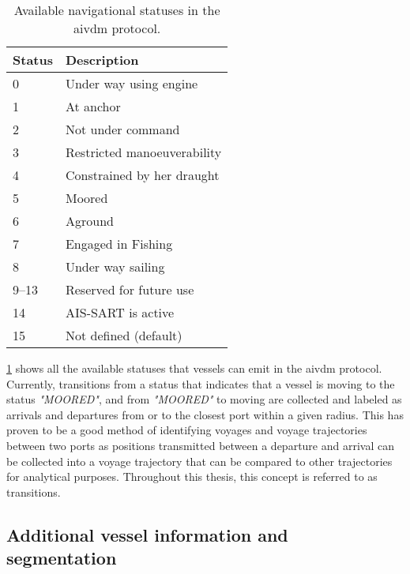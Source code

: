 \begin{table}
    \centering
    \small{\begin{tabular}{l l}
    \toprule
        \textbf{Status} & \textbf{Description} \\ \midrule
        0 & Under way using engine \\ \midrule
        1 & At anchor \\ \midrule
        2 & Not under command \\ \midrule
        3 & Restricted manoeuverability \\ \midrule
        4 & Constrained by her draught \\ \midrule
        5 & Moored \\ \midrule
        6 & Aground \\ \midrule
        7 & Engaged in Fishing \\ \midrule
        8 & Under way sailing \\ \midrule
        9--13 & Reserved for future use \\ \midrule
        14 & AIS-SART is active \\ \midrule
        15 & Not defined (default) \\ \bottomrule
    \end{tabular}}
    \caption{Available navigational statuses in the \gls{aivdm} protocol.}\label{tab:nav_stats}
\end{table}

\cref{tab:nav_stats} shows all the available statuses that vessels can emit in the \gls{aivdm} protocol. Currently, transitions from a status that indicates that a vessel is moving to the status \textit{"MOORED"}, and from \textit{"MOORED"} to moving are collected and labeled as arrivals and departures from or to the closest port within a given radius. This has proven to be a good method of identifying voyages and voyage trajectories between two ports as positions transmitted between a departure and arrival can be collected into a voyage trajectory that can be compared to other trajectories for analytical purposes. Throughout this thesis, this concept is referred to as \glspl{transition}.

\subsection{Additional vessel information and segmentation}
\label{sec:vessel_info_segments}

